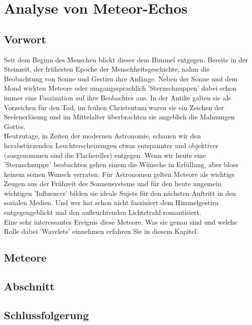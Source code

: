 %
%
%
\chapter{Analyse von Meteor-Echos\label{chapter:meteor}}
\begin{refsection}

\section{Vorwort}
Seit dem Beginn des Menschen blickt dieser dem Himmel entgegen. Bereits in der Steinzeit, der frühesten Epoche der Menschheitsgeschichte, nahm die Beobachtung von Sonne und Gestirn ihre Anfänge. Neben der Sonne und dem Mond wirkten Meteore oder umgangssprachlich 'Sternschnuppen' dabei schon immer eine Faszination auf ihre Beobachter aus. In der Antike galten sie als Vorzeichen für den Tod, im frühen Christentum waren sie ein Zeichen der Seelenerlösung und im Mittelalter überbrachten sie angeblich die Mahnungen Gottes. \\
Heutzutage, in Zeiten der modernen Astronomie, schauen wir den herabstürzenden Leuchterscheinungen etwas entspannter und objektiver (ausgenommen sind die Flacherdler) entgegen. Wenn wir heute eine 'Sternschnuppe' beobachten gehen einem die Wünsche in Erfüllung, aber bloss keinem seinen Wunsch verraten. Für Astronomen gelten Meteore als wichtige Zeugen aus der Frühzeit des Sonnensystems und für den heute ungemein wichtigen 'Influencer' bilden sie ideale Sujets für den nächsten Auftritt in den sozialen Medien. Und wer hat schon nicht fasziniert dem Himmelgestirn entgegengeblickt und den aufleuchtenden Lichtstrahl romantisiert. \\
Eine sehr interessantes Ereignis diese Meteore. Was sie genau sind und welche Rolle dabei 'Wavelets' einnehmen erfahren Sie in diesem Kapitel.

\section{Meteore}


\section{Abschnitt}

\section{Schlussfolgerung}

\printbibliography[heading=subbibliography]
\end{refsection}

